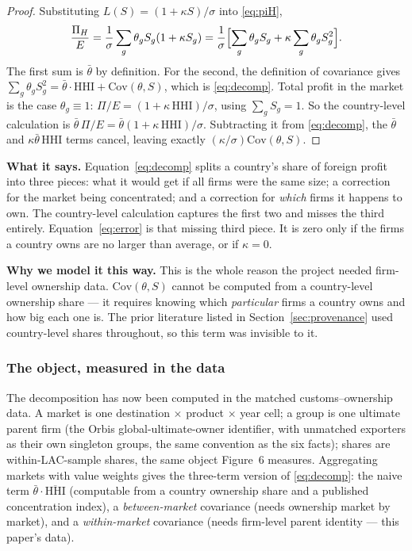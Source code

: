 \documentclass[11pt]{article}
\newcommand{\says}[1]{\smallskip\noindent\textbf{What it says.} #1\smallskip}
\newcommand{\why}[1]{\smallskip\noindent\textbf{Why we model it this way.} #1\smallskip}
\theoremstyle{plain}
\theoremstyle{remark}
\theoremstyle{definition}
\begin{document}
\begin{proof}
Substituting $L(S)=(1+\kappa S)/\sigma$ into \eqref{eq:piH},
\[
  \frac{\Pi_H}{E}=\frac1\sigma\sum_g\theta_gS_g(1+\kappa S_g)
  =\frac1\sigma\Bigl[\sum_g\theta_gS_g+\kappa\sum_g\theta_gS_g^2\Bigr].
\]
The first sum is $\bar\theta$ by definition. For the second, the definition of
covariance gives $\sum_g\theta_gS_g^2=\bar\theta\cdot\mathrm{HHI}+\mathrm{Cov}(\theta,S)$,
which is \eqref{eq:decomp}. Total profit in the market is the case $\theta_g\equiv1$:
$\Pi/E=(1+\kappa\,\mathrm{HHI})/\sigma$, using $\sum_gS_g=1$. So the country-level
calculation is $\bar\theta\,\Pi/E=\bar\theta(1+\kappa\,\mathrm{HHI})/\sigma$.
Subtracting it from \eqref{eq:decomp}, the $\bar\theta$ and
$\kappa\bar\theta\,\mathrm{HHI}$ terms cancel, leaving exactly
$(\kappa/\sigma)\mathrm{Cov}(\theta,S)$.
\end{proof}

\says{Equation~\eqref{eq:decomp} splits a country's share of foreign profit into three
pieces: what it would get if all firms were the same size; a correction for the market
being concentrated; and a correction for \emph{which} firms it happens to own. The
country-level calculation captures the first two and misses the third entirely.
Equation~\eqref{eq:error} is that missing third piece. It is zero only if the firms a
country owns are no larger than average, or if $\kappa=0$.}

\why{This is the whole reason the project needed firm-level ownership data.
$\mathrm{Cov}(\theta,S)$ cannot be computed from a country-level ownership share --- it
requires knowing which \emph{particular} firms a country owns and how big each one is.
The prior literature listed in Section~\ref{sec:provenance} used country-level shares
throughout, so this term was invisible to it.}

\subsubsection{The object, measured in the data}
\label{sec:covmeasured}

The decomposition has now been computed in the matched customs--ownership data. A
market is one destination $\times$ product $\times$ year cell; a group is one ultimate
parent firm (the Orbis global-ultimate-owner identifier, with unmatched exporters as
their own singleton groups, the same convention as the six facts); shares are
within-LAC-sample shares, the same object Figure~6 measures. Aggregating markets with
value weights gives the three-term version of \eqref{eq:decomp}: the naive term
$\bar\theta\cdot\overline{\mathrm{HHI}}$ (computable from a country ownership share and
a published concentration index), a \emph{between-market} covariance (needs ownership
market by market), and a \emph{within-market} covariance (needs firm-level parent
identity --- this paper's data).
\end{document}
